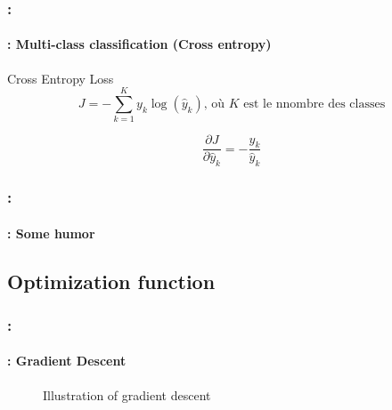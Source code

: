 \documentclass[xcolor=table]{beamer}
\begin{document}
\begin{frame}
	\frametitle{\insertshortsubtitle: \insertsection}
	\framesubtitle{\insertsubsection: Multi-class classification (Cross entropy)}
	
	\begin{block}{Cross Entropy Loss}
		\[J = - \sum\limits_{k=1}^{K} y_{k} \log(\hat{y}_{k}) \text{, où } K \text{ est le nnombre des classes} \]
		
		\[
		\frac{\partial J}{\partial \hat{y}_k} = - \frac{y_{k}}{\hat{y}_{k}}
		\]
	\end{block}


\end{frame}

\begin{frame}
	\frametitle{\insertshortsubtitle: \insertsection}
	\framesubtitle{\insertsubsection: Some humor}
	
	\begin{center}
	\end{center}
	
\end{frame}

\subsection{Optimization function}

\begin{frame}
	\frametitle{\insertshortsubtitle: \insertsection}
	\framesubtitle{\insertsubsection: Gradient Descent}
	
	\begin{figure}
		\caption{Illustration of gradient descent \cite{2020-calin}}
	\end{figure}

\end{frame}
\end{document}
